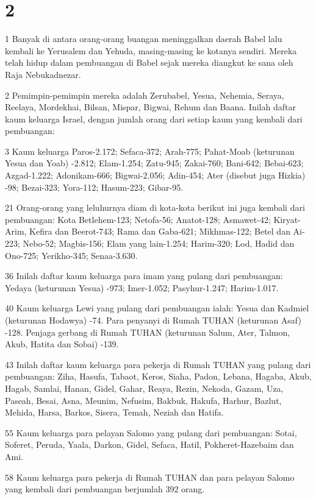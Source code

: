 \chapter{2}

\par 1 Banyak di antara orang-orang buangan meninggalkan daerah Babel lalu kembali ke Yerusalem dan Yehuda, masing-masing ke kotanya sendiri. Mereka telah hidup dalam pembuangan di Babel sejak mereka diangkut ke sana oleh Raja Nebukadnezar.
\par 2 Pemimpin-pemimpin mereka adalah Zerubabel, Yesua, Nehemia, Seraya, Reelaya, Mordekhai, Bilsan, Mispar, Bigwai, Rehum dan Baana. Inilah daftar kaum keluarga Israel, dengan jumlah orang dari setiap kaum yang kembali dari pembuangan:
\par 3 Kaum keluarga Paros-2.172; Sefaca-372; Arah-775; Pahat-Moab (keturunan Yesua dan Yoab) -2.812; Elam-1.254; Zatu-945; Zakai-760; Bani-642; Bebai-623; Azgad-1.222; Adonikam-666; Bigwai-2.056; Adin-454; Ater (disebut juga Hizkia) -98; Bezai-323; Yora-112; Hasum-223; Gibar-95.
\par 21 Orang-orang yang leluhurnya diam di kota-kota berikut ini juga kembali dari pembuangan: Kota Betlehem-123; Netofa-56; Anatot-128; Asmawet-42; Kiryat-Arim, Kefira dan Beerot-743; Rama dan Gaba-621; Mikhmas-122; Betel dan Ai-223; Nebo-52; Magbis-156; Elam yang lain-1.254; Harim-320; Lod, Hadid dan Ono-725; Yerikho-345; Senaa-3.630.
\par 36 Inilah daftar kaum keluarga para imam yang pulang dari pembuangan: Yedaya (keturunan Yesua) -973; Imer-1.052; Pasyhur-1.247; Harim-1.017.
\par 40 Kaum keluarga Lewi yang pulang dari pembuangan ialah: Yesua dan Kadmiel (keturunan Hodawya) -74. Para penyanyi di Rumah TUHAN (keturunan Asaf) -128. Penjaga gerbang di Rumah TUHAN (keturunan Salum, Ater, Talmon, Akub, Hatita dan Sobai) -139.
\par 43 Inilah daftar kaum keluarga para pekerja di Rumah TUHAN yang pulang dari pembuangan: Ziha, Hasufa, Tabaot, Keros, Siaha, Padon, Lebana, Hagaba, Akub, Hagab, Samlai, Hanan, Gidel, Gahar, Reaya, Rezin, Nekoda, Gazam, Uza, Paseah, Besai, Asna, Meunim, Nefusim, Bakbuk, Hakufa, Harhur, Bazlut, Mehida, Harsa, Barkos, Sisera, Temah, Neziah dan Hatifa.
\par 55 Kaum keluarga para pelayan Salomo yang pulang dari pembuangan: Sotai, Soferet, Peruda, Yaala, Darkon, Gidel, Sefaca, Hatil, Pokheret-Hazebaim dan Ami.
\par 58 Kaum keluarga para pekerja di Rumah TUHAN dan para pelayan Salomo yang kembali dari pembuangan berjumlah 392 orang.
